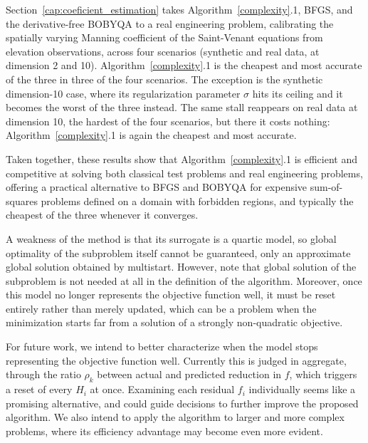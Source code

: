 \documentclass{article}
\begin{document}
Section~\ref{cap:coeficient_estimation} takes Algorithm~\ref{complexity}.1, BFGS, and
the derivative-free BOBYQA to a real engineering problem, calibrating
the spatially varying Manning coefficient of the Saint-Venant
equations from elevation observations, across four scenarios
(synthetic and real data, at dimension 2 and 10). Algorithm~\ref{complexity}.1 is the
cheapest and most accurate of the three in three of the four
scenarios. The exception is the synthetic dimension-10 case, where its
regularization parameter $\sigma$ hits its ceiling and it becomes the
worst of the three instead. The same stall reappears on real data at
dimension 10, the hardest of the four scenarios, but there it costs
nothing: Algorithm~\ref{complexity}.1 is again the cheapest and most accurate.

Taken together, these results show that Algorithm~\ref{complexity}.1
is efficient and competitive at solving both classical test problems
and real engineering problems, offering a practical alternative to
BFGS and BOBYQA for expensive sum-of-squares problems defined on a
domain with forbidden regions, and typically the cheapest of the three
whenever it converges.

A weakness of the method is that its surrogate is a quartic model, so
global optimality of the subproblem itself cannot be guaranteed, only
an approximate global solution obtained by multistart. However, note
that global solution of the subproblem is not needed at all in the
definition of the algorithm. Moreover, once
this model no longer represents the objective function well, it must
be reset entirely rather than merely updated, which can be a problem
when the minimization starts far from a solution of a strongly
non-quadratic objective.

For future work, we intend to better characterize when the model
stops representing the objective function well. Currently this is
judged in aggregate, through the ratio $\rho_k$ between actual and
predicted reduction in $f$, which triggers a reset of every $H_i$ at
once. Examining each residual $f_i$ individually seems like a
promising alternative, and could guide decisions to further improve
the proposed algorithm. We also intend to apply the algorithm to
larger and more complex problems, where its efficiency advantage may
become even more evident.




       
 
\end{document}

